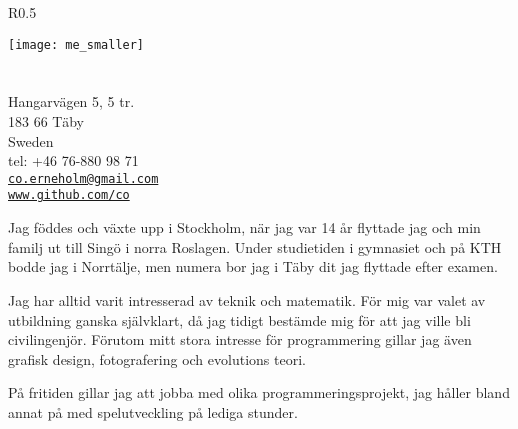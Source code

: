 \documentclass[margin,line]{resume}%
\begin{document}
{\sc \Large {}}%
\begin{resume}
    \vspace{0.5cm}
    \begin{wrapfigure}{R}{0.5\textwidth}
         \vspace{-1cm}
        \begin{center}
        \texttt{[image: me\_smaller]}
        \end{center}
         \vspace{-1cm}
    \end{wrapfigure}

	\section{}\vspace{0.001mm}
	Hangarvägen 5, 5 tr.  \\
	183 66 Täby  \\
	Sweden \\
	tel: +46 76-880 98 71\\
	\href{mailto:co.erneholm@gmail.com}{\texttt{co.erneholm@gmail.com}} \\
	\href{http://www.github.com/co}{\texttt{www.github.com/co}}

	Jag föddes och växte upp i Stockholm, när jag var 14 år flyttade jag
	och min familj ut till Singö i norra Roslagen. Under studietiden i
	gymnasiet och på KTH bodde jag i Norrtälje, men numera bor jag i Täby dit
	jag flyttade efter examen.

	Jag har alltid varit intresserad av teknik och
	matematik. För mig var valet av utbildning ganska självklart, då
	jag tidigt bestämde mig för att jag ville bli civilingenjör.
	Förutom mitt stora intresse för programmering gillar jag även grafisk
	design, fotografering och evolutions teori.
	
	På fritiden gillar jag att jobba med olika programmeringsprojekt, jag håller
	bland annat på med spelutveckling på lediga stunder.


\end{resume}
\end{document}
